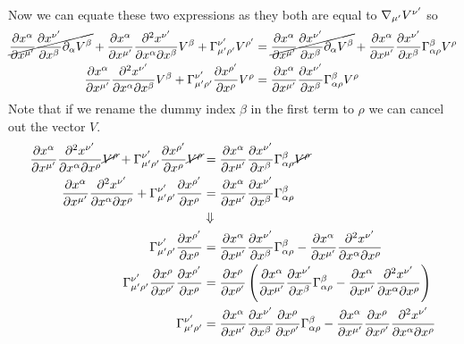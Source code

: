 \documentclass[11pt]{article}
\numberwithin{equation}{section}
\begin{document}
\begin{enumerate}[(a)]
\begin{align*}
\end{align*}
Now we can equate these two expressions as they both are equal to $\bold\nabla_{\mu'}V^{\nu'}$ so
\begin{align*}
 \cancel{\frac{\partial{x^{\alpha}}}{\partial{x^{\mu'}}}\frac{\partial{x^{\nu'}}}{\partial{x^{\beta}}}\partial_{\alpha}V^{\beta}} + \frac{\partial{x^{\alpha}}}{\partial{x^{\mu'}}}\frac{\partial^2x^{\nu'}}{\partial x^{\alpha}\partial x^{\beta}}V^{\beta} + \Gamma^{\nu'}_{\mu'\rho'}V^{\rho'} &= \cancel{\frac{\partial{x^{\alpha}}}{\partial{x^{\mu'}}}\frac{\partial{x^{\nu'}}}{\partial{x^{\beta}}}\partial_{\alpha}V^{\beta}} + \frac{\partial{x^{\alpha}}}{\partial{x^{\mu'}}}\frac{\partial{x^{\nu'}}}{\partial{x^{\beta}}}\Gamma^{\beta}_{\alpha\rho}V^{\rho}\\
 \frac{\partial{x^{\alpha}}}{\partial{x^{\mu'}}}\frac{\partial^2x^{\nu'}}{\partial x^{\alpha}\partial x^{\beta}}V^{\beta} + \Gamma^{\nu'}_{\mu'\rho'}\frac{\partial{x^{\rho'}}}{\partial{x^{\rho}}}V^{\rho} &= \frac{\partial{x^{\alpha}}}{\partial{x^{\mu'}}}\frac{\partial{x^{\nu'}}}{\partial{x^{\beta}}}\Gamma^{\beta}_{\alpha\rho}V^{\rho}
\end{align*}
Note that if we rename the dummy index $\beta$ in the first term to $\rho$ we can cancel out the vector $V$.
\begin{align*}
 \partiald{x^{\alpha}}{x^{\mu'}}\frac{\partial^2x^{\nu'}}{\partial x^{\alpha}\partial x^{\rho}}\cancel{V^{\rho}} + \Gamma^{\nu'}_{\mu'\rho'}\partiald{x^{\rho'}}{x^{\rho}}\cancel{V^{\rho}} &= \partiald{x^{\alpha}}{x^{\mu'}}\partiald{x^{\nu'}}{x^{\beta}}\Gamma^{\beta}_{\alpha\rho}\cancel{V^{\rho}}\\
 \partiald{x^{\alpha}}{x^{\mu'}}\frac{\partial^2x^{\nu'}}{\partial x^{\alpha}\partial x^{\rho}} + \Gamma^{\nu'}_{\mu'\rho'}\partiald{x^{\rho'}}{x^{\rho}} &= \partiald{x^{\alpha}}{x^{\mu'}}\partiald{x^{\nu'}}{x^{\beta}}\Gamma^{\beta}_{\alpha\rho}\\
&\Downarrow\\
  \Gamma^{\nu'}_{\mu'\rho'}\partiald{x^{\rho'}}{x^{\rho}} &= \partiald{x^{\alpha}}{x^{\mu'}}\partiald{x^{\nu'}}{x^{\beta}}\Gamma^{\beta}_{\alpha\rho} - \partiald{x^{\alpha}}{x^{\mu'}}\frac{\partial^2x^{\nu'}}{\partial x^{\alpha}\partial x^{\rho}}\\
  \Gamma^{\nu'}_{\mu'\rho'}\partiald{x^{\rho}}{x^{\rho'}}\partiald{x^{\rho'}}{x^{\rho}} &= \partiald{x^{\rho}}{x^{\rho'}}\left(\partiald{x^{\alpha}}{x^{\mu'}}\partiald{x^{\nu'}}{x^{\beta}}\Gamma^{\beta}_{\alpha\rho} - \partiald{x^{\alpha}}{x^{\mu'}}\frac{\partial^2x^{\nu'}}{\partial x^{\alpha}\partial x^{\rho}}\right)\\
  \Gamma^{\nu'}_{\mu'\rho'} &= \partiald{x^{\alpha}}{x^{\mu'}}\partiald{x^{\nu'}}{x^{\beta}}\partiald{x^{\rho}}{x^{\rho'}}\Gamma^{\beta}_{\alpha\rho} - \partiald{x^{\alpha}}{x^{\mu'}}\partiald{x^{\rho}}{x^{\rho'}}\frac{\partial^2x^{\nu'}}{\partial x^{\alpha}\partial x^{\rho}}

\end{align*}
\end{enumerate}
\end{document}
